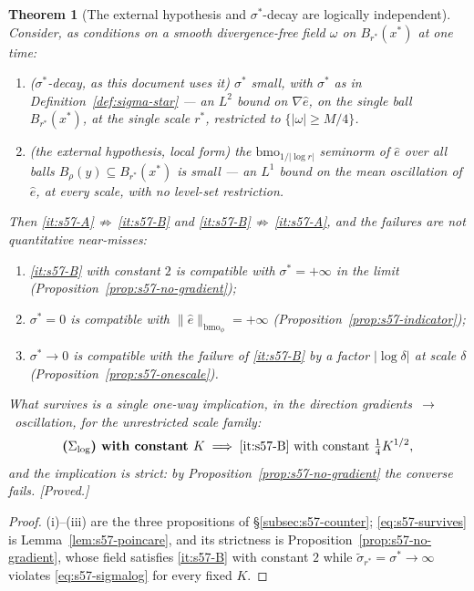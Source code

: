 \documentclass[11pt]{article}
\newtheorem{theorem}{Theorem}[section]
\theoremstyle{definition}
\theoremstyle{remark}
\begin{document}
\begin{theorem}[The external hypothesis and $\sigma^*$-decay are logically
  independent]\label{thm:s57-independence}
  Consider, as conditions on a smooth divergence-free field $\omega$ on
  $B_{r^*}(x^*)$ at one time:
  \begin{enumerate}[label=\textup{(\Alph*)},leftmargin=2.6em]
  \item\label{it:s57-A} \textup{($\sigma^*$-decay, as this document uses it)}
    $\sigma^*$ small, with $\sigma^*$ as in Definition~\ref{def:sigma-star} ---
    an $L^2$ bound on $\nabla\hat e$, on the single ball $B_{r^*}(x^*)$, at
    the single scale $r^*$, restricted to $\{|\omega|\geq M/4\}$.
  \item\label{it:s57-B} \textup{(the external hypothesis, local form)} the
    $\mathrm{bmo}_{1/|\log r|}$ seminorm of $\hat e$ over all balls
    $B_\rho(y)\subseteq B_{r^*}(x^*)$ is small --- an $L^1$ bound on the mean
    oscillation of $\hat e$, at every scale, with no level-set restriction.
  \end{enumerate}
  Then \ref{it:s57-A}$\,\not\Rightarrow\,$\ref{it:s57-B} and
  \ref{it:s57-B}$\,\not\Rightarrow\,$\ref{it:s57-A}, and the failures are not
  quantitative near-misses:
  \begin{enumerate}[label=\textup{(\roman*)},leftmargin=2.6em]
  \item \ref{it:s57-B} with constant $2$ is compatible with
    $\sigma^*=+\infty$ in the limit
    (Proposition~\ref{prop:s57-no-gradient});
  \item $\sigma^*=0$ is compatible with
    $\|\hat e\|_{\mathrm{bmo}_\phi}=+\infty$
    (Proposition~\ref{prop:s57-indicator});
  \item $\sigma^*\to0$ is compatible with the failure of \ref{it:s57-B} by a
    factor $|\log\delta|$ at scale $\delta$
    (Proposition~\ref{prop:s57-onescale}).
  \end{enumerate}
  What survives is a single one-way implication, in the direction
  gradients~$\to$~oscillation, for the \emph{unrestricted scale family}:
  \begin{equation}\label{eq:s57-survives}
    \textbf{($\Sigma_{\log}$) with constant }K
    \;\Longrightarrow\;\ref{it:s57-B}\text{ with constant }\tfrac14K^{1/2},
  \end{equation}
  and the implication is \emph{strict}: by
  Proposition~\ref{prop:s57-no-gradient} the converse fails.
  \emph{[Proved.]}
\end{theorem}
\begin{proof}
  (i)--(iii) are the three propositions of
  \S\ref{subsec:s57-counter}; \eqref{eq:s57-survives} is
  Lemma~\ref{lem:s57-poincare}, and its strictness is
  Proposition~\ref{prop:s57-no-gradient}, whose field satisfies
  \ref{it:s57-B} with constant $2$ while
  $\tilde\sigma_{r^*}=\sigma^*\to\infty$ violates
  \eqref{eq:s57-sigmalog} for every fixed $K$.
\end{proof}
\end{document}
